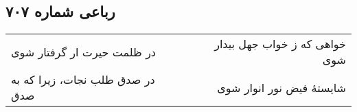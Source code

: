 \begin{center}
\section*{رباعی شماره ۷۰۷}
\label{sec:sh707}
\begin{longtable}{l p{0.5cm} r}
در ظلمت حیرت ار گرفتار شوی
&&
خواهی که ز خواب جهل بیدار شوی
\\
در صدق طلب نجات، زیرا که به صدق
&&
شایستهٔ فیض نور انوار شوی
\\
\end{longtable}
\end{center}
